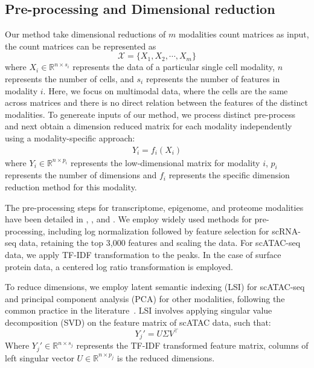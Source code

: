 \subsection{Pre-processing and Dimensional reduction}
\label{methods:integration:pre}
Our method take dimensional reductions of $m$ modalities count matrices as input, the count matrices can be represented as
\begin{equation}
    \mathcal{X}=\{X_1,X_2,\cdots,X_m\}
\end{equation}
where $X_{i} \in \mathbb{R}^{n\times s_{i}}$ represents the data of a particular single cell modality, $n$ represents the number of cells, and $s_{i}$ represents the number of features in modality $i$. Here, we focus on multimodal data, where the cells are the same across matrices and there is no direct relation between the features of the distinct modalities. To genereate inputs of our method, we process distinct pre-process and next obtain a dimension reduced matrix for each modality independently using a modality-specific approach: 
\begin{align}
    Y_{i}=f_{i}(X_{i})
\end{align}
where $Y_{i} \in \mathbb{R}^{n\times p_{i}}$ represents the low-dimensional matrix for modality $i$, $p_{i}$ represents the number of dimensions and $f_{i}$ represents the specific dimension reduction method for this modality. 

The pre-processing steps for transcriptome, epigenome, and proteome modalities have been detailed in , , and . We employ widely used methods for pre-processing, including log normalization followed by feature selection for scRNA-seq data, retaining the top 3,000 features and scaling the data. For scATAC-seq data, we apply TF-IDF transformation to the peaks. In the case of surface protein data, a centered log ratio transformation is employed.


To reduce dimensions, we employ latent semantic indexing (LSI) for scATAC-seq and principal component analysis (PCA) for other modalities, following the common practice in the literature~\cite{granja2021archr, signac, hao2021seurat4}. LSI involves applying singular value decomposition (SVD) on the feature matrix of scATAC data, such that:
\begin{equation}
    Y_{j}' = U\Sigma V^\top
\end{equation}
Where $Y_{j}'\in \mathbb{R}^{n\times s_{j}}$ represents the TF-IDF transformed feature matrix, columns of left singular vector $U\in \mathbb{R}^{n\times p_j}$ is the reduced dimensions.  

